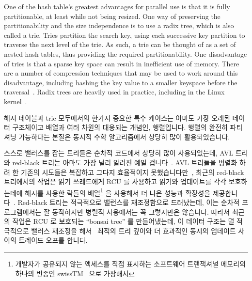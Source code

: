 One of the hash table's greatest advantages for parallel use is that it
is fully partitionable, at least while not being resized.
One way of preserving the partitionability and the size independence is
to use a radix tree, which is also called a trie.
Tries partition the search key, using each successive key partition
to traverse the next level of the trie.
As such, a trie can be thought of as a set of nested hash tables,
thus providing the required partitionability.
One disadvantage of tries is that a sparse key space can result in
inefficient use of memory.
There are a number of compression techniques that may be used to
work around this disadvantage, including hashing the key value to
a smaller keyspace before the
traversal~\cite{RobertOlsson2006a}.
Radix trees are heavily used in practice, including in the Linux
kernel~\cite{NickPiggin2006radixtree}.
\fi

해시 테이블과 trie 모두에서의 한가지 중요한 특수 케이스는 아마도 가장 오래된
데이터 구조체이고 배열과 여러 차원의 대응되는 개념인, 행렬입니다.
행렬의 완전히 파티셔닝 가능하다는 본질은 동시적 수학 알고리즘에서 상당히 많이
활용되었습니다.

스스로 밸러스를 잡는 트리들은 순차적 코드에서 상당히 많이 사용되었는데, AVL
트리와 red-black 트리는 아마도 가장 널리 알려진 예일
겁니다~\cite{ThomasHCorman2001Algorithms}.
AVL 트리들을 병렬화 하려 한 기존의 시도들은 복잡하고 그다지 효율적이지
못했습니다만~\cite{Ellis80}, 최근의 red-black 트리에서의 작업은 읽기 쓰레드에게
RCU 를 사용하고 읽기와 업데이트를 각각 보호하는데에 해시를 사용한 락들의
배열\footnote{
	개발자가 공유되지 않는 액세스를 직접 표시하는 소프트웨어 트랜잭셔널
	메모리의 하나의 변종인 swissTM~\cite{AleksandarDragovejic2011STMnotToy}
	으로 가장해서}
을 사용해서 더 나은 성능과 확장성을
제공합니다~\cite{PhilHoward2011RCUTMRBTree,PhilipWHoward2013RCUrbtree}.
Red-black 트리는 적극적으로 밸런스를 재조정함으로 드러났는데, 이는 순차적
프로그램에서는 잘 동작하지만 병렬적 사용에서는 꼭 그렇지만은 않습니다.
따라서 최근의 작업은 RCU 로 보호되는 ``bonsai tree'' 를 만들어냈는데, 이 데이터
구조는 덜 적극적으로 밸러스 재조정을
해서~\cite{AustinClements2012RCULinux:mmapsem} 최적의 트리 깊이와 더 효과적인
동시의 업데이트 사이의 트레이드 오프를 합니다.
\iffalse

